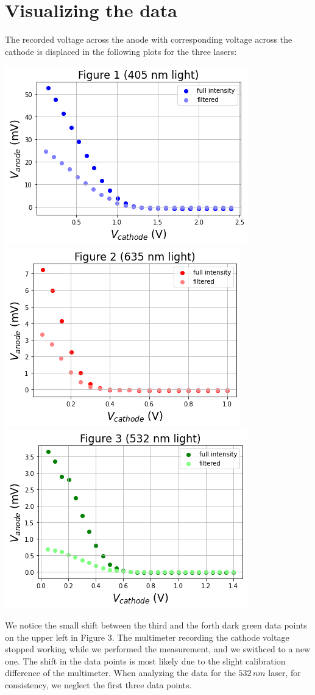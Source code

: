 \documentclass[11pt]{book}
\theoremstyle{break}
\theoremstyle{break}
\begin{document}
\section{Visualizing the data}
The recorded voltage across the anode with corresponding voltage across the cathode is displaced in the following plots for the three lasers:\\
\begin{center}
\includegraphics[scale=0.5]{fig1.png}\qquad
\includegraphics[scale=0.5]{fig2.png}\\
\hfill\break
\includegraphics[scale=0.45]{fig3.png}
\end{center}
We notice the small shift between the third and the forth dark green data points on the upper left in Figure 3. The multimeter recording the cathode voltage stopped working while we performed the measurement, and we swithced to a new one. The shift in the data points is most likely due to the slight calibration difference of the multimeter. When analyzing the data for the $532\, nm$ laser, for consistency, we neglect the first three data points. 
\end{document}
